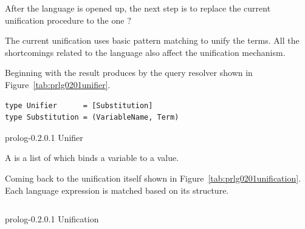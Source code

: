 \documentclass[thesis-solanki.tex]{subfiles}
\begin{document}
After the language is opened up, the next step is to replace the current unification procedure to the one {\Huge
  ?}


The current unification uses basic pattern matching to unify the terms. All the shortcomings related to the language also affect the
unification mechanism.

Beginning with the result produces by the query resolver shown in Figure~\ref{tab:prlg0201unifier}.
\begin{code-list}[h]
\begin{verbatim}
type Unifier      = [Substitution]
type Substitution = (VariableName, Term)
\end{verbatim}
\caption{prolog-0.2.0.1 Unifier}
\label{tab:prlg0201unifier}
\end{code-list}
A  is a list of  which binds a variable to a value.

Coming back to the unification itself shown in Figure~\ref{tab:prlg0201unification}.
Each language expression is matched based on its structure.

\begin{code-list}[h]
  \begin{singlespace}
    \inputminted[linenos]{haskell}{haskell-proto2-unification-lion.hs}
  \end{singlespace}
\caption{prolog-0.2.0.1 Unification}
\label{tab:prlg0201unification}
\end{code-list}
\end{document}
